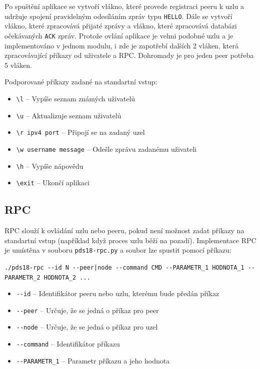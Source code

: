 \documentclass[11pt,a4paper,titlepage]{article}
\begin{document}
            Po spuštění aplikace se vytvoří vlákno, které provede registraci peeru k uzlu a udržuje spojení
            pravidelným odesíláním zpráv typu \texttt{HELLO}. Dále se vytvoří vlákno, které zpracovává přijaté
            zprávy a vlákno, které zpracovává databázi očekávaných \texttt{ACK} zpráv. Protože ovlání aplikace je velmi
            podobné uzlu a je implementováno v jednom modulu, i zde je zapotřebí dalších 2 vláken, která zpracovávající
            příkazy od uživatele a RPC. Dohromady je pro jeden peer potřeba 5 vláken.

            Podporované příkazy zadané na standartní vstup:
            \begin{itemize}
                \item \verb+\l+ -- Vypíše seznam známých uživatelů
                \item \verb+\u+ -- Aktualizuje seznam uživatelů
                \item \verb+\r ipv4 port+ -- Připojí se na zadaný uzel
                \item \verb+\w username message+ -- Odešle zprávu zadanému uživateli
                \item \verb+\h+ -- Vypíše nápovědu
                \item \verb+\exit+ -- Ukončí aplikaci
            \end{itemize}
        \subsection{RPC}
            RPC slouží k ovládání uzlu nebo peeru, pokud není možnost zadat příkazy na standartní vstup (například když proces uzlu běží na pozadí).
            Implementace RPC je umístěna v souboru \texttt{pds18-rpc.py} a soubor lze spustit pomocí příkazu:

            \verb+./pds18-rpc --id N --peer|node --command CMD --PARAMETR_1 HODNOTA_1 --PARAMETR_2 HODNOTA_2 ...+
            \begin{itemize}
                \item \verb+--id+ -- Identifikátor peeru nebo uzlu, kterému bude předán příkaz
                \item \verb+--peer+ -- Určuje, že se jedná o příkaz pro peer
                \item \verb+--node+ -- Určuje, že se jedná o příkaz pro uzel
                \item \verb+--command+ -- Identifikátor příkazu
                \item \verb+--PARAMETR_1+ -- Parametr příkazu a jeho hodnota
            \end{itemize}
\end{document}
